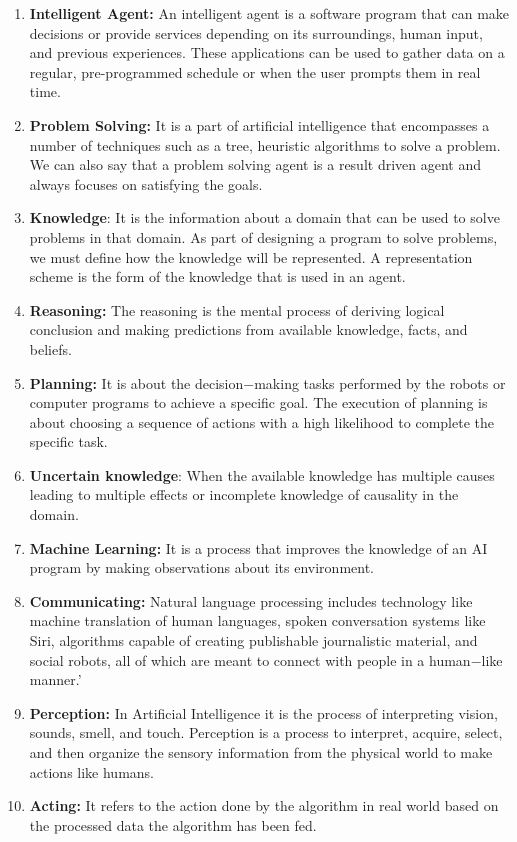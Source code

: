 \documentclass{article}
\begin{document}
\begin{enumerate}
	\item \textbf{Intelligent Agent: }An intelligent agent is a software program that can make decisions or provide services depending on its surroundings, human input, and previous experiences. These applications can be used to gather data on a regular, pre-programmed schedule or when the user prompts them in real time.

	\item \textbf{Problem Solving: }It is a part of artificial intelligence that encompasses a number of techniques such as a tree, heuristic algorithms to solve a problem. We can also say that a problem solving agent is a result driven agent and always focuses on satisfying the goals.

	\item \textbf{Knowledge}: It is the information about a domain that can be used to solve problems in that domain. As part of designing a program to solve problems, we must define how the knowledge will be represented. A representation scheme is the form of the knowledge that is used in an agent.

	\item \textbf{Reasoning: }The reasoning is the mental process of deriving logical conclusion and making predictions from available knowledge, facts, and beliefs.

	\item \textbf{Planning:} It is about the decision$-$making tasks performed by the robots or computer programs to achieve a specific goal. The execution of planning is about choosing a sequence of actions with a high likelihood to complete the specific task.

	\item \textbf{Uncertain knowledge}: When the available knowledge has multiple causes leading to multiple effects or incomplete knowledge of causality in the domain.

	\item \textbf{Machine Learning: }It is a process that improves the knowledge of an AI program by making observations about its environment.

	\item \textbf{Communicating:} Natural language processing includes technology like machine translation of human languages, spoken conversation systems like Siri, algorithms capable of creating publishable journalistic material, and social robots, all of which are meant to connect with people in a human$-$like manner.'

	\item \textbf{Perception:} In Artificial Intelligence it is the process of interpreting vision, sounds, smell, and touch. Perception is a process to interpret, acquire, select, and then organize the sensory information from the physical world to make actions like humans.

	\item \textbf{Acting:} It refers to the action done by the algorithm in real world based on the processed data the algorithm has been fed.\end{enumerate}
	
\end{document}
